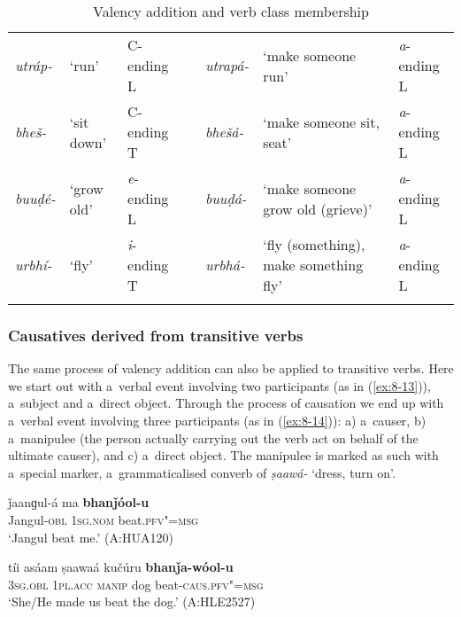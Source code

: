 \begin{table} 
\caption{Valency addition and verb class membership}
\begin{tabularx}{\textwidth}{ l  P{10mm}  l  l  l  Q  l }
\lsptoprule
\textit{utráp-} &
`run' &
C-ending L &
\centering {\textgreater} &
\textit{utrapá-} &
`make someone run' &
\textit{a}-ending L\\
\textit{bheš-} &
`sit down' &
C-ending T &
\centering {\textgreater} &
\textit{bhešá-} &
`make someone sit, seat' &
\textit{a}-ending L\\
\textit{buuḍé-} &
`grow old' &
\textit{e}-ending L &
\centering {\textgreater}\par
&
\textit{buuḍá-} &
`make someone grow old (grieve)' &
\textit{a}-ending L\\
\textit{urbhí-} &
`fly'
&
{\textit{i}-ending T}
&
\centering {\textgreater}\par
&
\textit{urbhá-}
&
`fly (something), make something fly' &
{\textit{a}-ending L}
\\\lspbottomrule
\end{tabularx}
\label{tab:8-addcl}
\end{table}

\subsubsection*{Causatives derived from transitive verbs}

The same process of valency addition can also be applied to transitive verbs. Here we start out with a~verbal event involving two participants (as in (\ref{ex:8-13})), a~subject and a~direct object. Through the process of causation we end up with a~verbal event involving three participants (as in (\ref{ex:8-14})): a) a~causer, b) a~manipulee (the person actually carrying out the verb act on behalf of the ultimate causer), and c) a~direct object. The manipulee is marked as such with a~special marker, a~grammaticalised converb of \textit{ṣaawá-} `dress, turn on'. 


\begin{exe}
\ex
\label{ex:8-13}
\gll ǰaanɡul-á ma \textbf{bhanǰóol-u} \\
Jangul-\textsc{obl} \textsc{1sg.nom} beat.\textsc{pfv"=msg} \\
\glt `Jangul beat me.' (A:HUA120)
\end{exe}
\begin{exe}
\ex
\label{ex:8-14}
\gll tíi asáam ṣaawaá kučúru \textbf{bhanǰa-wóol-u} \\
\textsc{3sg.obl} \textsc{1pl.acc} \textsc{manip} dog beat-\textsc{caus.pfv"=msg} \\
\glt `She/He made us beat the dog.' (A:HLE2527)
\end{exe}


